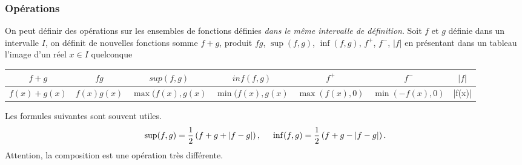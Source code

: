 \subsubsection{Opérations}
On peut définir des opérations sur les ensembles de fonctions définies \emph{dans le même intervalle de définition}.\newline
Soit $f$ et $g$ définie dans un intervalle $I$, on définit de nouvelles fonctions somme $f+g$, produit $fg$, $\sup(f,g)$, $\inf(f,g)$, $f^{+}$, $f^{-}$, $|f|$ en présentant dans un tableau l'image d'un réel $x\in I$ quelconque
\begin{center}
\renewcommand{\arraystretch}{1.5}
\begin{tabular}{|c|c|c|c|c|c|c|} \hline
$f+g$ & $fg$ & $sup(f,g)$ & $inf(f,g)$ & $f^+$ & $f^-$ & $|f|$ \\ \hline
$f(x) + g(x)$ & $f(x)g(x)$ & $\max(f(x),g(x)$ & $\min(f(x),g(x)$ & $\max(f(x),0)$ & $\min(-f(x),0)$ & |f(x)| \\ \hline
\end{tabular}
\end{center}
Les formules suivantes sont souvent utiles.
\begin{displaymath}
 \sup(f,g) = \frac{1}{2}\left( f + g + |f-g|\right), \hspace{0.5cm}  
 \inf(f,g) = \frac{1}{2}\left( f + g - |f-g|\right).
\end{displaymath}
Attention, la composition est une opération très différente.
